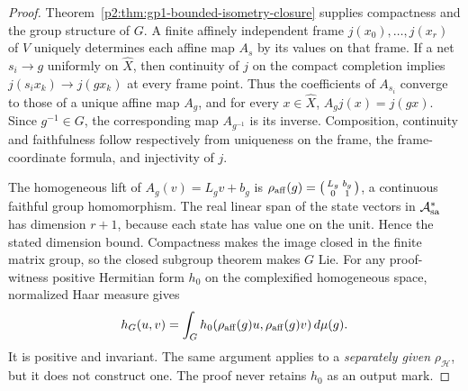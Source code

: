 \documentclass[12pt,a4paper]{article}
\begin{document}
\begin{proof}
Theorem~\ref{p2:thm:gp1-bounded-isometry-closure} supplies compactness
and the group structure of \(G\).  A finite affinely independent frame
\(j(x_0),\ldots,j(x_r)\) of \(V\) uniquely determines each affine
map \(A_s\) by its values on that frame.  If a net \(s_i\to g\)
uniformly on \(\widehat X\), then continuity of \(j\) on the compact
completion implies
\(j(s_i x_k)\to j(gx_k)\) at every frame point.  Thus
the coefficients of \(A_{s_i}\) converge to those of a unique affine
map \(A_g\), and for every \(x\in\widehat X\),
\(A_gj(x)=j(gx)\).  Since \(g^{-1}\in G\), the corresponding map
\(A_{g^{-1}}\) is its inverse.  Composition, continuity and
faithfulness follow respectively from uniqueness on the frame, the
frame-coordinate formula, and injectivity of \(j\).

The homogeneous lift of \(A_g(v)=L_gv+b_g\) is
\(\rho_{\rm aff}(g)=\left(\begin{smallmatrix}L_g&b_g\\0&1\end{smallmatrix}\right)\),
a continuous faithful group homomorphism.  The real linear span of
the state vectors in \(\mathcal A_{\rm sa}^*\) has dimension
\(r+1\), because each state has value one on the unit.  Hence the
stated dimension bound.  Compactness makes the image closed in the
finite matrix group, so the closed subgroup theorem makes \(G\) Lie.
For any proof-witness positive Hermitian form \(h_0\) on the complexified
homogeneous space, normalized Haar measure gives
\[
 h_G(u,v)=\int_G h_0(\rho_{\rm aff}(g)u,
                    \rho_{\rm aff}(g)v)\,d\mu(g).
\]
It is positive and invariant.  The same argument applies to a
\emph{separately given} \(\rho_{\mathcal H}\), but it does not
construct one.  The proof never retains \(h_0\) as an output mark.
\end{proof}
\end{document}
